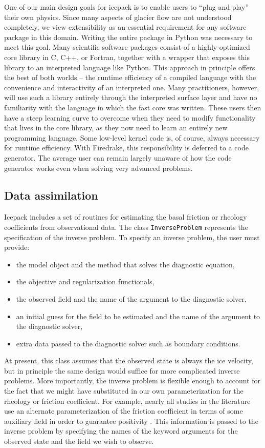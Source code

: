 \documentclass{article}
\theoremstyle{definition}
\theoremstyle{plain}
\begin{document}
One of our main design goals for icepack is to enable users to ``plug and play'' their own physics.
Since many aspects of glacier flow are not understood completely, we view extensibility as an essential requirement for any software package in this domain.
Writing the entire package in Python was necessary to meet this goal.
Many scientific software packages consist of a highly-optimized core library in C, C++, or Fortran, together with a wrapper that exposes this library to an interpreted language like Python.
This approach in principle offers the best of both worlds -- the runtime efficiency of a compiled language with the convenience and interactivity of an interpreted one.
Many practitioners, however, will use such a library entirely through the interpreted surface layer and have no familiarity with the language in which the fast core was written.
These users then have a steep learning curve to overcome when they need to modify functionality that lives in the core library, as they now need to learn an entirely new programming language.
Some low-level kernel code is, of course, always necessary for runtime efficiency.
With Firedrake, this responsibility is deferred to a code generator.
The average user can remain largely unaware of how the code generator works even when solving very advanced problems.


\subsection{Data assimilation}

Icepack includes a set of routines for estimating the basal friction or rheology coefficients from observational data.
The class \texttt{InverseProblem} represents the specification of the inverse problem.
To specify an inverse problem, the user must provide:
\begin{itemize}
    \item the model object and the method that solves the diagnostic equation,
    \item the objective and regularization functionals,
    \item the observed field and the name of the argument to the diagnostic solver,
    \item an initial guess for the field to be estimated and the name of the argument to the diagnostic solver,
    \item extra data passed to the diagnostic solver such as boundary conditions.
\end{itemize}
At present, this class assumes that the observed state is always the ice velocity, but in principle the same design would suffice for more complicated inverse problems.
More importantly, the inverse problem is flexible enough to account for the fact that we might have substituted in our own parameterization for the rheology or friction coefficient.
For example, nearly all studies in the literature use an alternate parameterization of the friction coefficient in terms of some auxiliary field in order to guarantee positivity \citep{macayeal1992basal, joughin2009basal}.
This information is passed to the inverse problem by specifying the names of the keyword arguments for the observed state and the field we wish to observe.
\end{document}

